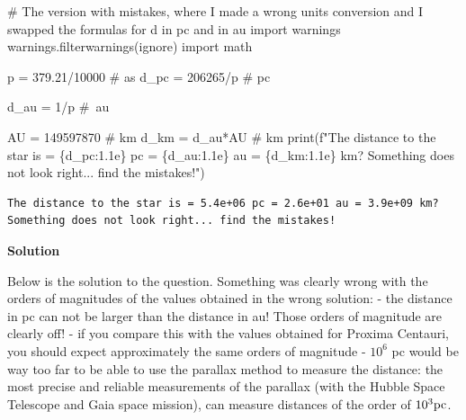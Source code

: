 \documentclass[
  letterpaper,
  DIV=11,
  numbers=noendperiod]{scrartcl}
\newenvironment{Shaded}{\begin{snugshade}}{\end{snugshade}}
\newcommand{\BuiltInTok}[1]{\textcolor[rgb]{0.00,0.23,0.31}{#1}}
\newcommand{\CommentTok}[1]{\textcolor[rgb]{0.37,0.37,0.37}{#1}}
\newcommand{\DecValTok}[1]{\textcolor[rgb]{0.68,0.00,0.00}{#1}}
\newcommand{\FloatTok}[1]{\textcolor[rgb]{0.68,0.00,0.00}{#1}}
\newcommand{\ImportTok}[1]{\textcolor[rgb]{0.00,0.46,0.62}{#1}}
\newcommand{\NormalTok}[1]{\textcolor[rgb]{0.00,0.23,0.31}{#1}}
\newcommand{\OperatorTok}[1]{\textcolor[rgb]{0.37,0.37,0.37}{#1}}
\newcommand{\SpecialCharTok}[1]{\textcolor[rgb]{0.37,0.37,0.37}{#1}}
\newcommand{\SpecialStringTok}[1]{\textcolor[rgb]{0.13,0.47,0.30}{#1}}
\newcommand{\StringTok}[1]{\textcolor[rgb]{0.13,0.47,0.30}{#1}}
\begin{document}
\begin{Shaded}
\begin{Highlighting}[]
\CommentTok{\# The version with mistakes, where I made a wrong units conversion and I swapped the formulas for d in pc and in au}
\ImportTok{import}\NormalTok{ warnings}
\NormalTok{warnings.filterwarnings(}\StringTok{\textquotesingle{}ignore\textquotesingle{}}\NormalTok{)}
\ImportTok{import}\NormalTok{ math}

\NormalTok{p }\OperatorTok{=} \FloatTok{379.21}\OperatorTok{/}\DecValTok{10000} \CommentTok{\# as }
\NormalTok{d\_pc }\OperatorTok{=} \DecValTok{206265}\OperatorTok{/}\NormalTok{p }\CommentTok{\# pc}

\NormalTok{d\_au }\OperatorTok{=} \DecValTok{1}\OperatorTok{/}\NormalTok{p }\CommentTok{\# au}

\NormalTok{AU }\OperatorTok{=} \DecValTok{149597870} \CommentTok{\# km}
\NormalTok{d\_km }\OperatorTok{=}\NormalTok{ d\_au}\OperatorTok{*}\NormalTok{AU }\CommentTok{\# km}
\BuiltInTok{print}\NormalTok{(}\SpecialStringTok{f"The distance to the star is = }\SpecialCharTok{\{}\NormalTok{d\_pc}\SpecialCharTok{:1.1e\}}\SpecialStringTok{ pc = }\SpecialCharTok{\{}\NormalTok{d\_au}\SpecialCharTok{:1.1e\}}\SpecialStringTok{ au = }\SpecialCharTok{\{}\NormalTok{d\_km}\SpecialCharTok{:1.1e\}}\SpecialStringTok{ km? Something does not look right... find the mistakes!"}\NormalTok{)}
\end{Highlighting}
\end{Shaded}

\begin{verbatim}
The distance to the star is = 5.4e+06 pc = 2.6e+01 au = 3.9e+09 km? Something does not look right... find the mistakes!
\end{verbatim}

\textbf{Solution}

Below is the solution to the question. Something was clearly wrong with
the orders of magnitudes of the values obtained in the wrong solution: -
the distance in pc can not be larger than the distance in au! Those
orders of magnitude are clearly off! - if you compare this with the
values obtained for Proxima Centauri, you should expect approximately
the same orders of magnitude - \(10^6\) pc would be way too far to be
able to use the parallax method to measure the distance: the most
precise and reliable measurements of the parallax (with the Hubble Space
Telescope and Gaia space mission), can measure distances of the order of
\(10^3\rm{pc}\).
\end{document}
